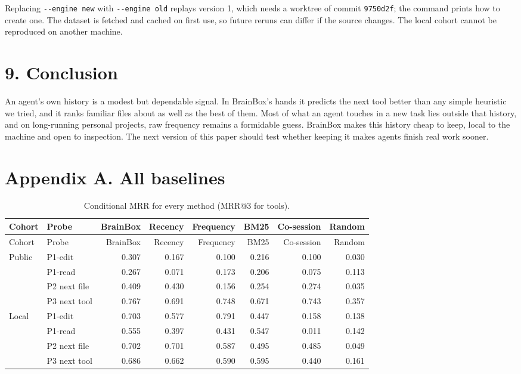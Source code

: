 \documentclass[
  american,
  11pt,
]{article}
\begin{document}
Replacing \texttt{-\/-engine\ new} with \texttt{-\/-engine\ old} replays version 1, which needs a worktree of
commit \texttt{9750d2f}; the command prints how to create one. The dataset is fetched and cached on first use,
so future reruns can differ if the source changes. The local cohort cannot be reproduced on another machine.

\section{9. Conclusion}\label{conclusion}

An agent's own history is a modest but dependable signal. In BrainBox's hands it predicts the next tool better
than any simple heuristic we tried, and it ranks familiar files about as well as the best of them. Most of
what an agent touches in a new task lies outside that history, and on long-running personal projects, raw
frequency remains a formidable guess. BrainBox makes this history cheap to keep, local to the machine and open
to inspection. The next version of this paper should test whether keeping it makes agents finish real work
sooner.

\newpage

\section*{Appendix A. All baselines}\label{appendix-a.-all-baselines}

\begin{longtable}[]{@{}llrrrrrr@{}}
\caption{Conditional MRR for every method (MRR@3 for tools).}\tabularnewline
\toprule\noalign{}
Cohort & Probe & BrainBox & Recency & Frequency & BM25 & Co-session & Random \\
\midrule\noalign{}
\endfirsthead
\toprule\noalign{}
Cohort & Probe & BrainBox & Recency & Frequency & BM25 & Co-session & Random \\
\midrule\noalign{}
\endhead
\bottomrule\noalign{}
\endlastfoot
Public & P1-edit & 0.307 & 0.167 & 0.100 & 0.216 & 0.100 & 0.030 \\
& P1-read & 0.267 & 0.071 & 0.173 & 0.206 & 0.075 & 0.113 \\
& P2 next file & 0.409 & 0.430 & 0.156 & 0.254 & 0.274 & 0.035 \\
& P3 next tool & 0.767 & 0.691 & 0.748 & 0.671 & 0.743 & 0.357 \\
Local & P1-edit & 0.703 & 0.577 & 0.791 & 0.447 & 0.158 & 0.138 \\
& P1-read & 0.555 & 0.397 & 0.431 & 0.547 & 0.011 & 0.142 \\
& P2 next file & 0.702 & 0.701 & 0.587 & 0.495 & 0.485 & 0.049 \\
& P3 next tool & 0.686 & 0.662 & 0.590 & 0.595 & 0.440 & 0.161 \\
\end{longtable}
\end{document}

